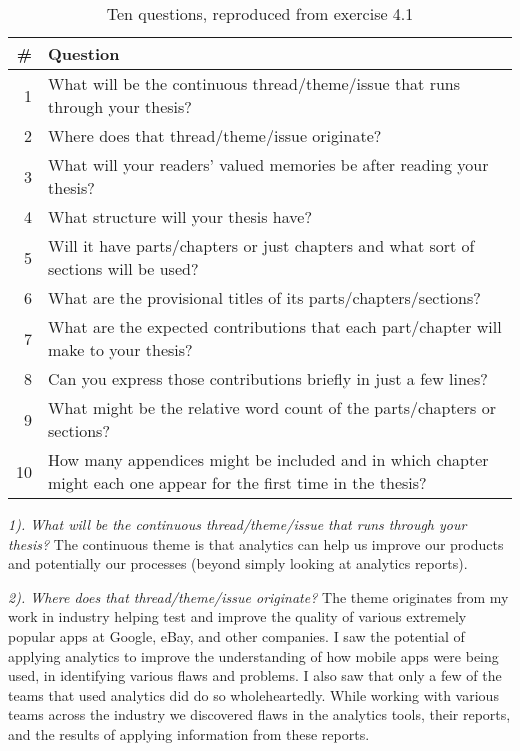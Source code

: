 \begin{table}[ht]
    \centering
    \footnotesize
    \begin{tabular}{r|p{12cm}}
        \# &Question  \\
         \hline
    1 &What will be the continuous thread/theme/issue that runs through
your thesis? \\
    2 &Where does that thread/theme/issue originate? \\
    3 &What will your readers’ valued memories be after reading your
thesis? \\
    4 &What structure will your thesis have? \\
    5 &Will it have parts/chapters or just chapters and what sort of sections
will be used? \\
    6 &What are the provisional titles of its parts/chapters/sections? \\
    7 &What are the expected contributions that each part/chapter will
make to your thesis? \\
    8 &Can you express those contributions briefly in just a few lines? \\
    9 &What might be the relative word count of the parts/chapters or
sections? \\
    10 &How many appendices might be included and in which chapter
might each one appear for the first time in the thesis? \\
    \end{tabular}
    \caption{Ten questions, reproduced from exercise 4.1}
    \label{tab:ten_questions_on_your_thesis}
\end{table}

\emph{1). What will be the continuous thread/theme/issue that runs through
your thesis?} The continuous theme is that analytics can help us improve our products and potentially our processes (beyond simply looking at analytics reports).

\emph{2). Where does that thread/theme/issue originate?} The theme originates from my work in industry helping test and improve the quality of various extremely popular apps at Google, eBay, and other companies. I saw the potential of applying analytics to improve the understanding of how mobile apps were being used, in identifying various flaws and problems. I also saw that only a few of the teams that used analytics did do so wholeheartedly. While working with various teams across the industry we discovered flaws in the analytics tools, their reports, and the results of applying information from these reports.

